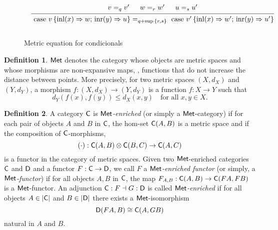 \documentclass[10pt,a4paper]{amsart}
\theoremstyle{definition}
\newtheorem{definition}{Definition}[section]
\theoremstyle{definition}
\theoremstyle{definition}
\theoremstyle{definition}
\theoremstyle{definition}
\theoremstyle{definition}
\begin{document}
\begin{figure}[H]
  \begin{equation*}
  \begin{aligned}
  &
  &
  \begin{prooftree}
      \hypo{ v =_{q} v' }
      \hypo{w=_{r} w'}
      \hypo{u=_{s}u'}
      \infer3[]{\text{ case } v \,   \{\text{inl} (x) \Rightarrow w ; \, \text{inr} (y) \Rightarrow u\} =_{q+\sup{\{ r, s \}}} \text{ case } v' \,  \{\text{inl} (x) \Rightarrow w' ; \,\text{inr} (y) \Rightarrow u'\} }
  \end{prooftree}
  \\[10pt]
  \end{aligned}
  \end{equation*}
  \caption{Metric equation for condicionals}
  \label{fig:metric conditionals}
\end{figure}



\begin{definition}
    $\mathsf{Met}$ denotes the category whose objects are metric spaces and whose morphisms are non-expansive maps, \ie, functions that do not increase the distance between points. More precisely, for two metric spaces $(X, d_X)$ and $(Y, d_Y)$, a morphism $f: (X, d_X) \to (Y, d_Y)$ is a function $f: X \to Y$ such that
$$
d_Y(f(x), f(y)) \leq d_X(x, y) \quad \text{for all } x, y \in X.
$$
  \end{definition}
    


\begin{definition}
 A category $\mathsf{C}$ is $\mathsf{Met}$\emph{-enriched} (or simply a $\mathsf{Met}$-category) if for each pair of objects $A$ and $B$ in $\mathsf{C}$, the hom-set $\mathsf{C}(A, B)$ is a metric space and if the composition of $\mathsf{C}$-morphisms,
 $$(\cdot): \mathsf{C}(A, B) \otimes \mathsf{C}(B, C) \rightarrow \mathsf{C}(A, C)$$
 is a functor in the category of metric spaces. 
 Given two $\mathsf{Met}$-enriched categories $\mathsf{C}$ and $\mathsf{D}$ and a functor $F : \mathsf{C}\to \mathsf{D}$, we call 
$F$ a \emph{$\mathsf{Met}$-enriched functor} (or simply, a \emph{$\mathsf{Met}$-functor}) if for all objects $A, B$ in $\mathsf{C}$, 
the map $F_{A,B} : \mathsf{C}(A,B) \to \mathsf{C}(FA, FB)$ is a $\mathsf{Met}$-functor. 
An adjunction $\mathsf{C} : F \dashv G : \mathsf{D}$ is called \emph{$\mathsf{Met}$-enriched} if for all objects $A \in |\mathsf{C}|$ 
and $B \in |\mathsf{D}|$ there exists a $\mathsf{Met}$-isomorphism
\[
\mathsf{D}(FA, B) \cong \mathsf{C}(A, GB)
\]
natural in $A$ and $B$.
\end{definition}
\end{document}
